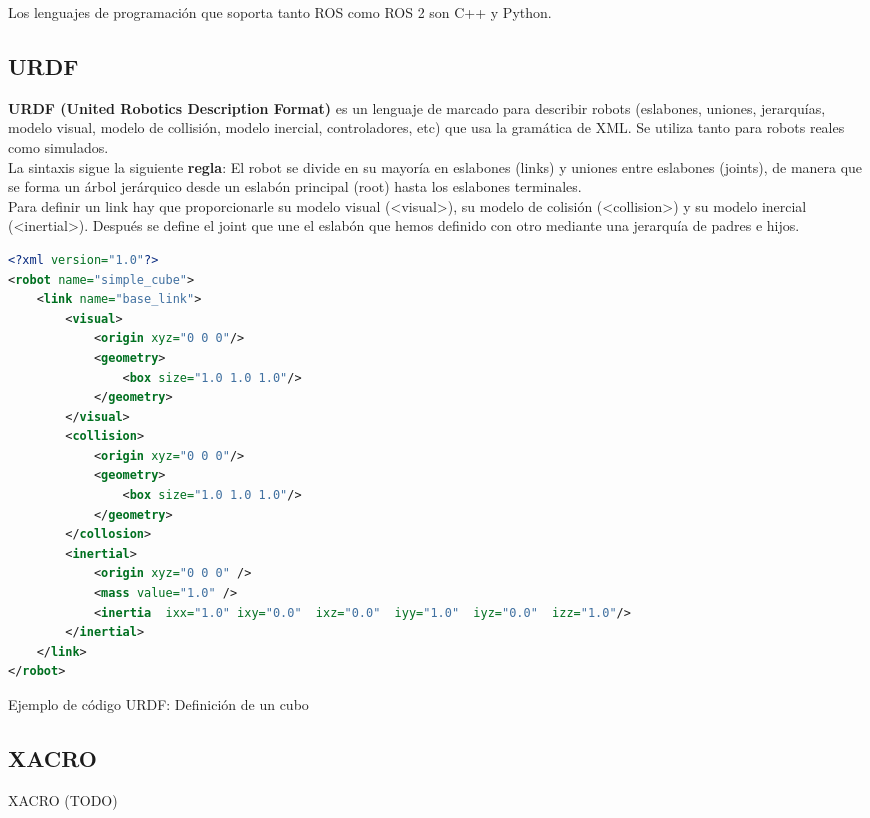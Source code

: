 Los lenguajes de programación que soporta tanto ROS como ROS 2 son C++ y Python.\\

\subsection{URDF}
\label{sec:urdf}

\textbf{URDF (United Robotics Description Format)} es un lenguaje de marcado para describir robots (eslabones, uniones, jerarquías, modelo visual, modelo de collisión, modelo inercial, controladores, etc) que usa la gramática de XML. Se utiliza tanto para robots reales como simulados.\\

La sintaxis sigue la siguiente \textbf{regla}: El robot se divide en su mayoría en eslabones (links) y uniones entre eslabones (joints), de manera que se forma un árbol jerárquico desde un eslabón principal (root) hasta los eslabones terminales.\\

Para definir un link hay que proporcionarle su modelo visual (<visual>), su modelo de colisión (<collision>) y su modelo inercial (<inertial>). Después se define el joint que une el eslabón que hemos definido con otro mediante una jerarquía de padres e hijos.\\

\begin{code}[h]
\begin{lstlisting}[language=XML]
<?xml version="1.0"?>
<robot name="simple_cube">
	<link name="base_link">
		<visual>
			<origin xyz="0 0 0"/>
			<geometry>
				<box size="1.0 1.0 1.0"/>
			</geometry>
		</visual>
		<collision>
			<origin xyz="0 0 0"/>
			<geometry>
				<box size="1.0 1.0 1.0"/>
			</geometry>
		</collosion>
		<inertial>
			<origin xyz="0 0 0" /> 
			<mass value="1.0" />
			<inertia  ixx="1.0" ixy="0.0"  ixz="0.0"  iyy="1.0"  iyz="0.0"  izz="1.0"/>
		</inertial>
	</link>
</robot>
\end{lstlisting}
\caption[Ejemplo de código URDF: Definición de un cubo]{Ejemplo de código URDF: Definición de un cubo}
\label{cod:codigo_urdf}
\end{code}

\subsection{XACRO}
\label{sec:xacro}

XACRO (TODO)

